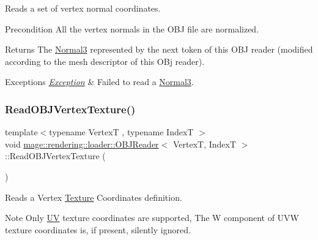 Reads a set of vertex normal coordinates.

\begin{DoxyPrecond}{Precondition}
All the vertex normals in the O\+BJ file are normalized. 
\end{DoxyPrecond}
\begin{DoxyReturn}{Returns}
The {\ttfamily \hyperlink{structmage_1_1_normal3}{Normal3}} represented by the next token of this O\+BJ reader (modified according to the mesh descriptor of this O\+Bj reader). 
\end{DoxyReturn}

\begin{DoxyExceptions}{Exceptions}
{\em \hyperlink{classmage_1_1_exception}{Exception}} & Failed to read a {\ttfamily \hyperlink{structmage_1_1_normal3}{Normal3}}. \\
\hline
\end{DoxyExceptions}
\hypertarget{classmage_1_1rendering_1_1loader_1_1_o_b_j_reader_a91f53fd761c83c4135a3ef1882b8300d}{}\label{classmage_1_1rendering_1_1loader_1_1_o_b_j_reader_a91f53fd761c83c4135a3ef1882b8300d} 
\subsubsection{\texorpdfstring{Read\+O\+B\+J\+Vertex\+Texture()}{ReadOBJVertexTexture()}}
{\footnotesize\ttfamily template$<$typename VertexT , typename IndexT $>$ \\
void \hyperlink{classmage_1_1rendering_1_1loader_1_1_o_b_j_reader}{mage\+::rendering\+::loader\+::\+O\+B\+J\+Reader}$<$ VertexT, IndexT $>$\+::Read\+O\+B\+J\+Vertex\+Texture (\begin{DoxyParamCaption}{ }\end{DoxyParamCaption})\hspace{0.3cm}{\ttfamily [private]}}

Reads a Vertex \hyperlink{classmage_1_1rendering_1_1_texture}{Texture} Coordinates definition.

\begin{DoxyNote}{Note}
Only \hyperlink{structmage_1_1_u_v}{UV} texture coordinates are supported, The W component of U\+VW texture coordinates is, if present, silently ignored. 
\end{DoxyNote}

